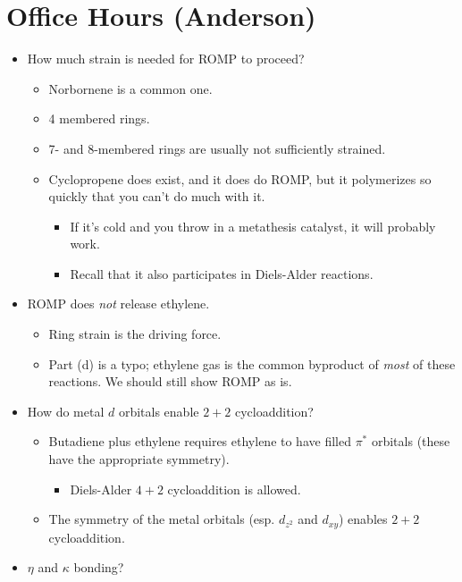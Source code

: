 \documentclass[../notes.tex]{subfiles}
\begin{document}
\section{Office Hours (Anderson)}
\begin{itemize}
    \item How much strain is needed for ROMP to proceed?
    \begin{itemize}
        \item Norbornene is a common one.
        \item 4 membered rings.
        \item 7- and 8-membered rings are usually not sufficiently strained.
        \item Cyclopropene does exist, and it does do ROMP, but it polymerizes so quickly that you can't do much with it.
        \begin{itemize}
            \item If it's cold and you throw in a metathesis catalyst, it will probably work.
            \item Recall that it also participates in Diels-Alder reactions.
        \end{itemize}
    \end{itemize}
    \item ROMP does \emph{not} release ethylene.
    \begin{itemize}
        \item Ring strain is the driving force.
        \item Part (d) is a typo; ethylene gas is the common byproduct of \emph{most} of these reactions. We should still show ROMP as is.
    \end{itemize}
    \item How do metal $d$ orbitals enable $2+2$ cycloaddition?
    \begin{itemize}
        \item Butadiene plus ethylene requires ethylene to have filled $\pi^*$ orbitals (these have the appropriate symmetry).
        \begin{itemize}
            \item Diels-Alder $4+2$ cycloaddition is allowed.
        \end{itemize}
        \item The symmetry of the metal orbitals (esp. $d_{z^2}$ and $d_{xy}$) enables $2+2$ cycloaddition.
    \end{itemize}
    \item $\eta$ and $\kappa$ bonding?
    \begin{itemize}

\end{itemize}
\end{itemize}
\end{document}
